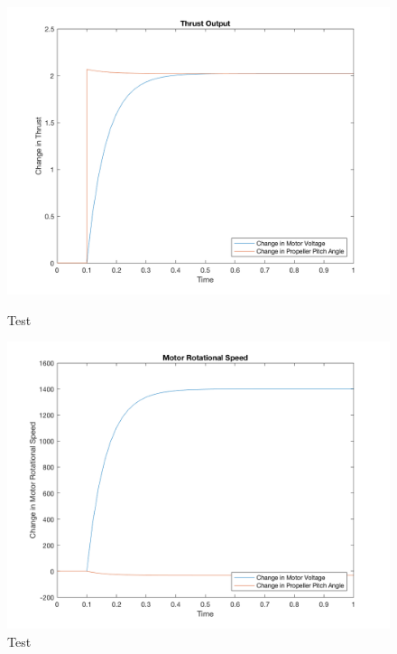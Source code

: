 \begin{figure}[H]
        \centering
         \begin{minipage}[b]{0.49\textwidth}
            \includegraphics[width = 1\textwidth]{VAPIQ-PICTURES/thrustoutput.png}
              \caption{Test}
            \label{fig:bla}
        \end{minipage}
        \hfill
        \begin{minipage}[b]{0.49\textwidth}
            \includegraphics[width = \textwidth]{VAPIQ-PICTURES/motrotspeed.png}
            \caption{Test}
            \label{fig:blablabla}
        \end{minipage}
\end{figure}

\newpage


